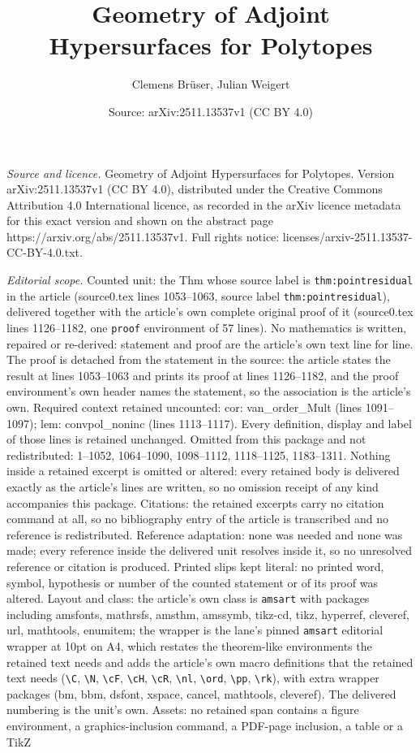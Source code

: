 \documentclass[10pt,a4paper]{amsart}
\title[Geometry of Adjoint Hypersurfaces for Polytopes]{Geometry of Adjoint Hypersurfaces for Polytopes}
\author{Clemens Br\"user, Julian Weigert}
\date{Source: arXiv:2511.13537v1 (CC BY 4.0)}
\begin{document}
\maketitle

\noindent\emph{Source and licence.} Geometry of Adjoint Hypersurfaces for Polytopes. Version arXiv:2511.13537v1 (CC BY 4.0), distributed under the Creative Commons Attribution 4.0 International licence, as recorded in the arXiv licence metadata for this exact version and shown on the abstract page https://arxiv.org/abs/2511.13537v1. Full rights notice: licenses/arxiv-2511.13537-CC-BY-4.0.txt.\par\smallskip

\noindent\textit{Editorial scope.} Counted unit: the Thm whose source label is \texttt{thm:pointresidual} in the article (source0.tex lines 1053--1063, source label \texttt{thm:pointresidual}), delivered together with the article's own complete original proof of it (source0.tex lines 1126--1182, one \texttt{proof} environment of 57 lines). No mathematics is written, repaired or re-derived: statement and proof are the article's own text line for line. The proof is detached from the statement in the source: the article states the result at lines 1053--1063 and prints its proof at lines 1126--1182, and the proof environment's own header names the statement, so the association is the article's own. Required context retained uncounted: cor: van\_order\_Mult (lines 1091--1097); lem: convpol\_noninc (lines 1113--1117). Every definition, display and label of those lines is retained unchanged. Omitted from this package and not redistributed: 1--1052, 1064--1090, 1098--1112, 1118--1125, 1183--1311. Nothing inside a retained excerpt is omitted or altered: every retained body is delivered exactly as the article's lines are written, so no omission receipt of any kind accompanies this package. Citations: the retained excerpts carry no citation command at all, so no bibliography entry of the article is transcribed and no reference is redistributed. Reference adaptation: none was needed and none was made; every reference inside the delivered unit resolves inside it, so no unresolved reference or citation is produced. Printed slips kept literal: no printed word, symbol, hypothesis or number of the counted statement or of its proof was altered. Layout and class: the article's own class is \texttt{amsart} with packages including amsfonts, mathrsfs, amsthm, amssymb, tikz-cd, tikz, hyperref, cleveref, url, mathtools, enumitem; the wrapper is the lane's pinned \texttt{amsart} editorial wrapper at 10pt on A4, which restates the theorem-like environments the retained text needs and adds the article's own macro definitions that the retained text needs (\texttt{\textbackslash C}, \texttt{\textbackslash N}, \texttt{\textbackslash cF}, \texttt{\textbackslash cH}, \texttt{\textbackslash cR}, \texttt{\textbackslash nl}, \texttt{\textbackslash ord}, \texttt{\textbackslash pp}, \texttt{\textbackslash rk}), with extra wrapper packages (bm, bbm, dsfont, xspace, cancel, mathtools, cleveref). The delivered numbering is the unit's own. Assets: no retained span contains a figure environment, a graphics-inclusion command, a PDF-page inclusion, a table or a TikZ 
\end{document}
